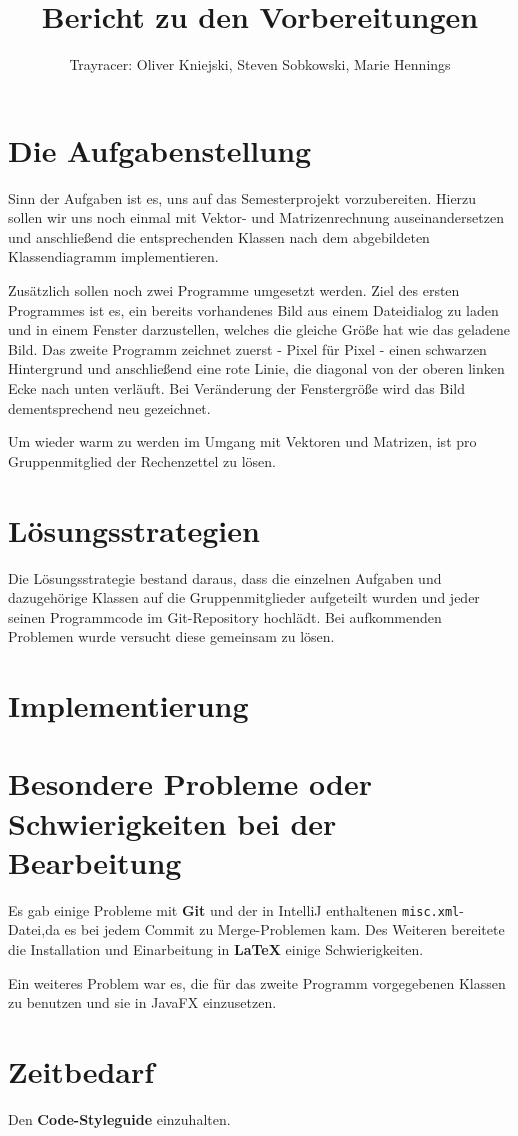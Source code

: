 \documentclass[a4paper,parskip=half,11pt]{scrartcl}
\author{Trayracer: Oliver Kniejski, Steven Sobkowski, Marie Hennings}
\title{Bericht zu den Vorbereitungen}
\begin{document}
 
\maketitle

\section{Die Aufgabenstellung}

Sinn der Aufgaben ist es, uns auf das Semesterprojekt vorzubereiten.
Hierzu sollen wir uns noch einmal mit Vektor- und Matrizenrechnung auseinandersetzen und anschließend die
entsprechenden Klassen nach dem abgebildeten Klassendiagramm implementieren. 

Zusätzlich sollen noch zwei Programme umgesetzt werden.
Ziel des ersten Programmes ist es, ein bereits vorhandenes Bild aus einem Dateidialog zu laden und in einem Fenster darzustellen, welches die gleiche Größe hat wie das geladene Bild.
Das zweite Programm zeichnet zuerst - Pixel für Pixel - einen schwarzen Hintergrund und anschließend eine rote Linie, die diagonal von der oberen linken Ecke nach unten verläuft. 
Bei Veränderung der Fenstergröße wird das Bild dementsprechend neu gezeichnet.

Um wieder warm zu werden im Umgang mit Vektoren und Matrizen, ist pro Gruppenmitglied der Rechenzettel zu lösen. 

\section{Lösungsstrategien}
Die Lösungsstrategie bestand daraus, dass die einzelnen Aufgaben und dazugehörige Klassen auf die Gruppenmitglieder  aufgeteilt wurden und jeder seinen Programmcode im Git-Repository hochlädt.
Bei aufkommenden Problemen wurde versucht diese gemeinsam zu lösen.

\section{Implementierung}

\section{Besondere Probleme oder Schwierigkeiten bei der Bearbeitung}
Es gab einige Probleme mit \textbf{Git} und der in IntelliJ enthaltenen {\small\texttt{misc.xml}}-Datei,da es bei jedem Commit zu Merge-Problemen kam. Des Weiteren bereitete die Installation und Einarbeitung in \textbf{\LaTeX{}} einige Schwierigkeiten. 



Ein weiteres Problem war es, die für das zweite Programm vorgegebenen Klassen zu benutzen und sie in JavaFX einzusetzen.




\section{Zeitbedarf}
Den \textbf{Code-Styleguide} einzuhalten.
\end{document}
